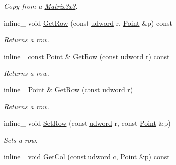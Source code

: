 \begin{DoxyCompactItemize}
\begin{DoxyCompactList}\small\item\em Copy from a \hyperlink{class_matrix3x3}{Matrix3x3}. \end{DoxyCompactList}\item 
\hypertarget{class_matrix3x3_ac0fd6aa5e05e474951995431032f32d2}{inline\+\_\+ void \hyperlink{class_matrix3x3_ac0fd6aa5e05e474951995431032f32d2}{Get\+Row} (const \hyperlink{_ice_types_8h_a44c6f1920ba5551225fb534f9d1a1733}{udword} r, \hyperlink{class_point}{Point} \&p) const }\label{class_matrix3x3_ac0fd6aa5e05e474951995431032f32d2}

\begin{DoxyCompactList}\small\item\em Returns a row. \end{DoxyCompactList}\item 
\hypertarget{class_matrix3x3_a82a2357d38e6b987e36cec2995b11aa8}{inline\+\_\+ const \hyperlink{class_point}{Point} \& \hyperlink{class_matrix3x3_a82a2357d38e6b987e36cec2995b11aa8}{Get\+Row} (const \hyperlink{_ice_types_8h_a44c6f1920ba5551225fb534f9d1a1733}{udword} r) const }\label{class_matrix3x3_a82a2357d38e6b987e36cec2995b11aa8}

\begin{DoxyCompactList}\small\item\em Returns a row. \end{DoxyCompactList}\item 
\hypertarget{class_matrix3x3_a1ece9d22cf514597b268b3bc129995ff}{inline\+\_\+ \hyperlink{class_point}{Point} \& \hyperlink{class_matrix3x3_a1ece9d22cf514597b268b3bc129995ff}{Get\+Row} (const \hyperlink{_ice_types_8h_a44c6f1920ba5551225fb534f9d1a1733}{udword} r)}\label{class_matrix3x3_a1ece9d22cf514597b268b3bc129995ff}

\begin{DoxyCompactList}\small\item\em Returns a row. \end{DoxyCompactList}\item 
\hypertarget{class_matrix3x3_ab27a1b055f5dcd6cb38d2a6291ff7cd4}{inline\+\_\+ void \hyperlink{class_matrix3x3_ab27a1b055f5dcd6cb38d2a6291ff7cd4}{Set\+Row} (const \hyperlink{_ice_types_8h_a44c6f1920ba5551225fb534f9d1a1733}{udword} r, const \hyperlink{class_point}{Point} \&p)}\label{class_matrix3x3_ab27a1b055f5dcd6cb38d2a6291ff7cd4}

\begin{DoxyCompactList}\small\item\em Sets a row. \end{DoxyCompactList}\item 
\hypertarget{class_matrix3x3_a8d4813c36f57e9b563902989d9e2b86a}{inline\+\_\+ void \hyperlink{class_matrix3x3_a8d4813c36f57e9b563902989d9e2b86a}{Get\+Col} (const \hyperlink{_ice_types_8h_a44c6f1920ba5551225fb534f9d1a1733}{udword} c, \hyperlink{class_point}{Point} \&p) const }\label{class_matrix3x3_a8d4813c36f57e9b563902989d9e2b86a}


\end{DoxyCompactItemize}
